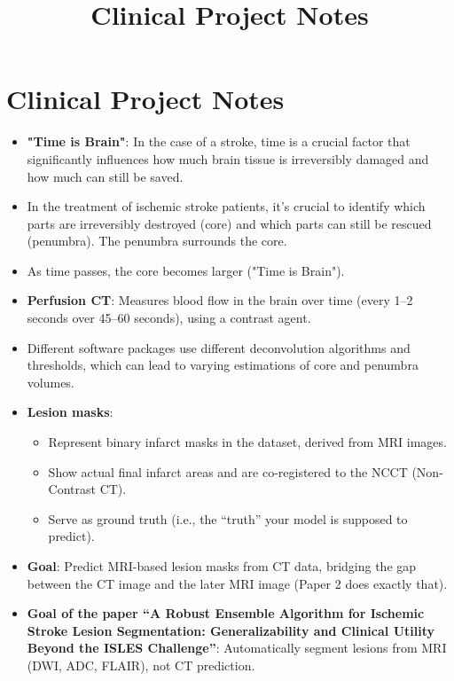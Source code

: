 \documentclass[a4paper,12pt]{article}
\title{Clinical Project Notes}
\date{}
\begin{document}
\maketitle

\section*{Clinical Project Notes}

\begin{itemize}
    \item \textbf{"Time is Brain"}: In the case of a stroke, time is a crucial factor that significantly influences how much brain tissue is irreversibly damaged and how much can still be saved.

    \item In the treatment of ischemic stroke patients, it's crucial to identify which parts are irreversibly destroyed (core) and which parts can still be rescued (penumbra). The penumbra surrounds the core.

    \item As time passes, the core becomes larger ("Time is Brain").

    \item \textbf{Perfusion CT}: Measures blood flow in the brain over time (every 1–2 seconds over 45–60 seconds), using a contrast agent.

    \item Different software packages use different deconvolution algorithms and thresholds, which can lead to varying estimations of core and penumbra volumes.

    \item \textbf{Lesion masks}: 
    \begin{itemize}
        \item Represent binary infarct masks in the dataset, derived from MRI images.
        \item Show actual final infarct areas and are co-registered to the NCCT (Non-Contrast CT).
        \item Serve as ground truth (i.e., the “truth” your model is supposed to predict).
    \end{itemize}

    \item \textbf{Goal}: Predict MRI-based lesion masks from CT data, bridging the gap between the CT image and the later MRI image (Paper 2 does exactly that).

    \item \textbf{Goal of the paper “A Robust Ensemble Algorithm for Ischemic Stroke Lesion Segmentation: Generalizability and Clinical Utility Beyond the ISLES Challenge”}:
    Automatically segment lesions from MRI (DWI, ADC, FLAIR), not CT prediction.


\end{itemize}
\end{document}
